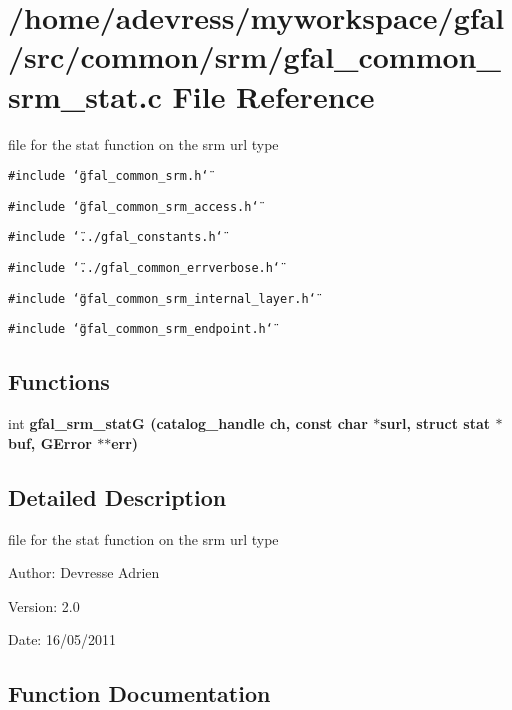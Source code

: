 \section{/home/adevress/myworkspace/gfal/src/common/srm/gfal\_\-common\_\-srm\_\-stat.c File Reference}
\label{gfal__common__srm__stat_8c}
file for the stat function on the srm url type 

{\tt \#include \char`\"{}gfal\_\-common\_\-srm.h\char`\"{}}\par
{\tt \#include \char`\"{}gfal\_\-common\_\-srm\_\-access.h\char`\"{}}\par
{\tt \#include \char`\"{}../gfal\_\-constants.h\char`\"{}}\par
{\tt \#include \char`\"{}../gfal\_\-common\_\-errverbose.h\char`\"{}}\par
{\tt \#include \char`\"{}gfal\_\-common\_\-srm\_\-internal\_\-layer.h\char`\"{}}\par
{\tt \#include \char`\"{}gfal\_\-common\_\-srm\_\-endpoint.h\char`\"{}}\par
\subsection*{Functions}
\begin{CompactItemize}
\item 
int \bf{gfal\_\-srm\_\-stat\-G} (catalog\_\-handle ch, const char $\ast$surl, struct stat $\ast$buf, GError $\ast$$\ast$err)
\end{CompactItemize}


\subsection{Detailed Description}
file for the stat function on the srm url type 

\begin{Desc}
\item[Author:]Devresse Adrien \end{Desc}
\begin{Desc}
\item[Version:]2.0 \end{Desc}
\begin{Desc}
\item[Date:]16/05/2011 \end{Desc}


\subsection{Function Documentation}
